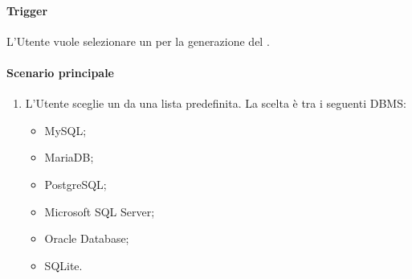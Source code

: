 \paragraph*{Trigger}
L'Utente vuole selezionare un  per la generazione del .

\paragraph*{Scenario principale}
\begin{enumerate}
  \item L'Utente sceglie un  da una lista predefinita. La scelta è tra i seguenti DBMS:
    \begin{itemize}
      \item MySQL;
      \item MariaDB;
      \item PostgreSQL;
      \item Microsoft SQL Server;
      \item Oracle Database;
      \item SQLite.
    \end{itemize} 
\end{enumerate}